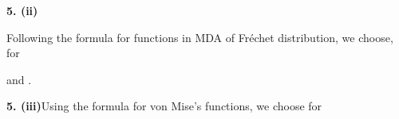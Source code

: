 \documentclass{article}
\begin{document}
\begin{Maple Normal}{
\begin{Maple Normal}{
}\end{Maple Normal}
}\end{Maple Normal}
\begin{Maple Normal}{
\begin{Maple Normal}{
\textbf{5. (ii)}}\end{Maple Normal}

}\end{Maple Normal}

\begin{Maple Normal}{
\begin{Maple Normal}{
Following the formula for functions in MDA of Fréchet distribution, we choose, for
}\end{Maple Normal}

}\end{Maple Normal}

\begin{Maple Normal}{
\begin{Maple Normal}{
}\end{Maple Normal}
}\end{Maple Normal}
\begin{Maple Normal}{
\begin{Maple Normal}{
and
.}\end{Maple Normal}

}\end{Maple Normal}

\begin{Maple Normal}{
\begin{Maple Normal}{
}\end{Maple Normal}
}\end{Maple Normal}
\begin{Maple Normal}{
\begin{Maple Normal}{
\textbf{5. (iii)}Using the formula for von Mise's functions, we choose for
}\end{Maple Normal}

}\end{Maple Normal}
\end{document}
